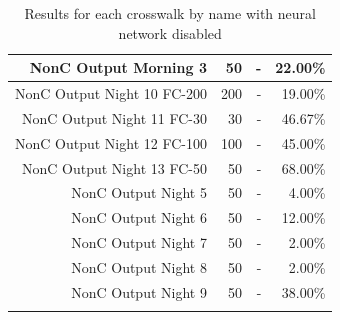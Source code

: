 \documentclass[12pt]{ucthesis}
\begin{document}
\begin{longtable}{|r|r|r|r|}
    \hline
    NonC Output Morning 3 & 50 & -  & 22.00\% \bigstrut\\
    \hline
    NonC Output Night 10 FC-200 & 200 & -  & 19.00\% \bigstrut\\
    \hline
    NonC Output Night 11 FC-30 & 30 & -  & 46.67\% \bigstrut\\
    \hline
    NonC Output Night 12 FC-100 & 100 & -  & 45.00\% \bigstrut\\
    \hline
    NonC Output Night 13 FC-50 & 50 & -  & 68.00\% \bigstrut\\
    \hline
    NonC Output Night 5 & 50 & -  & 4.00\% \bigstrut\\
    \hline
    NonC Output Night 6 & 50 & -  & 12.00\% \bigstrut\\
    \hline
    NonC Output Night 7 & 50 & -  & 2.00\% \bigstrut\\
    \hline
    NonC Output Night 8 & 50 & -  & 2.00\% \bigstrut\\
    \hline
    NonC Output Night 9 & 50 & -  & 38.00\% \bigstrut\\
    \hline

    
    \caption{Results for each crosswalk by name with neural network disabled}
    \label{tab:appendixcrosswalkresultswithoutNeural} 
    \end{longtable}
\end{document}
